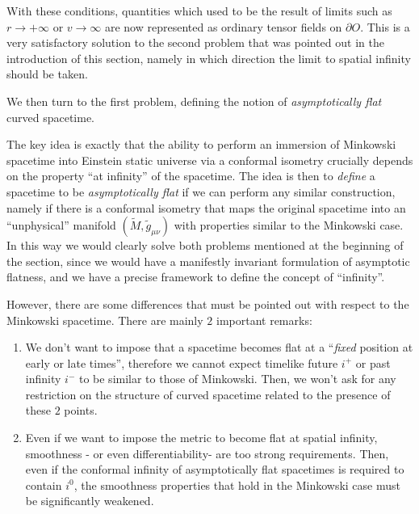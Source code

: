 With these conditions, quantities which used to be the result of limits such as \(r\rightarrow +\infty\) or \(v\rightarrow \infty\) are now represented as ordinary tensor fields on \(\partial O\). This is a very satisfactory solution to the second problem that was pointed out in the introduction of this section, namely in which direction the limit to spatial infinity should be taken.

We then turn to the first problem, defining the notion of \emph{asymptotically flat} curved spacetime.

The key idea is exactly that the ability to perform an immersion of Minkowski spacetime into Einstein static universe via a conformal isometry crucially depends on the property ``at infinity'' of the spacetime. The idea is then to \emph{define} a spacetime to be \emph{asymptotically flat} if we can perform any similar construction, namely if there is a conformal isometry that maps the original spacetime into an ``unphysical'' manifold \((\tilde{M}, \tilde{g}_{\mu\nu})\) with properties similar to the Minkowski case.
In this way we would clearly solve both problems mentioned at the beginning of the section, since we would have a manifestly invariant formulation of asymptotic flatness, and we have a precise framework to define the concept of ``infinity''.

\begin{remark}
	However, there are some differences that must be pointed out with respect to the Minkowski spacetime. There are mainly \(2\) important remarks:
	\begin{enumerate}[label=(\Roman*)]
		\item We don't want to impose that a spacetime becomes flat at a ``\emph{fixed} position at early or late times'', therefore we cannot expect timelike future \(i^{+}\) or past infinity \(i^{-}\) to be similar to those of Minkowski. Then, we won't ask for any restriction on the structure of curved spacetime related to the presence of these \(2\) points.
		\item  Even if we want to impose the metric to become flat at spatial infinity, smoothness - or even differentiability- are too strong requirements. Then, even if the conformal infinity of asymptotically flat spacetimes is required to contain \(i^0\), the smoothness properties that hold in the Minkowski case must be significantly weakened.
	\end{enumerate}
\end{remark}


